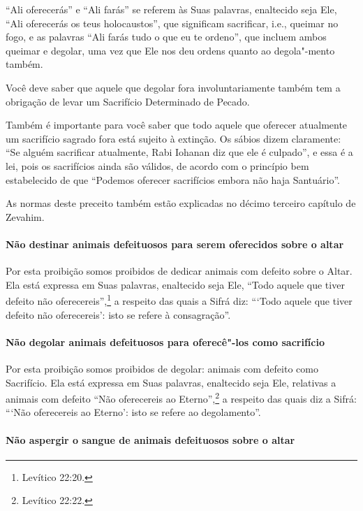\begin{multicols}{2}
``Ali oferecerás'' e ``Ali farás'' se referem às Suas palavras,
enaltecido seja Ele, ``Ali oferecerás os teus holocaustos'', que
significam sacrificar, i.e., queimar no fogo, e as palavras ``Ali farás
tudo o que eu te ordeno'', que incluem ambos queimar e degolar, uma vez
que Ele nos deu ordens quanto ao degola"-mento também.

Você deve saber que aquele que degolar fora involuntariamente também
tem a obrigação de levar um Sacrifício Determinado de Pecado.

Também é importante para você saber que todo aquele que oferecer
atualmente um sacrifício sagrado fora está sujeito à extinção. Os sábios
dizem claramente: ``Se alguém sacrificar atualmente, Rabi Iohanan\starr{} diz
que ele é culpado'', e essa é a lei, pois os sacrifícios ainda são
válidos, de acordo com o princípio bem estabelecido de que ``Podemos
oferecer sacrifícios embora não haja Santuário''.

As normas deste preceito também estão explicadas no décimo terceiro
capítulo de Zevahim\starr.

\paragraph{Não destinar animais defeituosos para serem oferecidos sobre o altar}

Por esta proibição somos proibidos de dedicar animais com defeito sobre
o Altar. Ela está expressa em Suas palavras, enaltecido seja Ele, ``Todo
aquele que tiver defeito não oferecereis'',\footnote{Levítico 22:20.} a respeito
das quais a Sifrá\starr{} diz: ```Todo aquele que tiver defeito não
oferecereis': isto se refere à consagração''.

\paragraph{Não degolar animais defeituosos para oferecê"-los como sacrifício}

Por esta proibição somos proibidos de degolar: animais com defeito como
Sacrifício. Ela está expressa em Suas palavras, enaltecido seja Ele,
relativas a animais com defeito ``Não oferecereis ao Eterno'',\footnote{Levítico
22:22.} a respeito das quais diz a Sifrá\starr: ```Não oferecereis ao Eterno':
isto se refere ao degolamento''.


\paragraph{Não aspergir o sangue de animais defeituosos sobre o altar}


\end{multicols}
